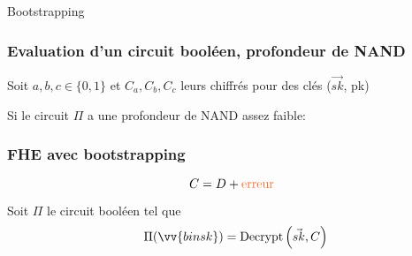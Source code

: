 \documentclass[10pt,xcolor={usenames,dvipsnames}]{beamer}
\begin{document}
\begin{section}{Bootstrapping}

\begin{frame}[fragile]
\frametitle{Evaluation d'un circuit booléen, profondeur de NAND}
Soit $a,b,c\in\{0, 1\}$ et $C_a, C_b, C_c$ leurs chiffrés pour des clés ($\vec{sk}$, pk)
  \begin{center}
      \begin{tikzpicture}[scale = 1, transform shape]
      	
      \end{tikzpicture}
  \end{center}
  Si le circuit $\Pi$ a une profondeur de NAND assez faible:
  \vspace{-0.5cm}
\begin{center}
\end{center}

\end{frame}

 
\begin{frame}[fragile]
\frametitle{FHE avec bootstrapping}
\[ C = D + \text{\textcolor{Orange}{erreur}} \]
  \noindent
  \begin{center}
      \begin{tikzpicture}[scale = 1, transform shape]
      	
      \end{tikzpicture}
  \end{center}
  \noindent
  \vspace{-0.7cm}

\pause

Soit $\Pi$ le circuit booléen tel que 
\[\quad\Pi(\vv{binsk}) = \text{Decrypt}\left(\vec{sk}, C\right) \]


\end{frame}
\end{section}
\end{document}

